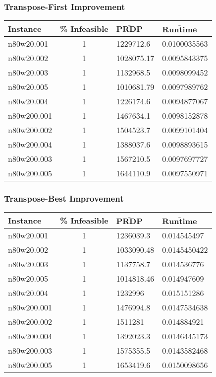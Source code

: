 \begin{homeworkProblem}
\subsubsection{Transpose-First Improvement}
\begin{center}
\begin{tabular}{|l|c|l|l|}
\hline
\textbf{Instance}& \textbf{\% Infeasible} & $\mathbf{\bar{PRDP}}$ &$\mathbf{\bar{Runtime}}$\\
\hline
n80w20.001&1&1229712.6&0.0100035563\\
\hline
n80w20.002&1&1028075.17&0.0095843375\\
\hline
n80w20.003&1&1132968.5&0.0098099452\\
\hline
n80w20.005&1&1010681.79&0.0097989762\\
\hline
n80w20.004&1&1226174.6&0.0094877067\\
\hline
n80w200.001&1&1467634.1&0.0098152878\\
\hline
n80w200.002&1&1504523.7&0.0099101404\\
\hline
n80w200.004&1&1388037.6&0.0098893615\\
\hline
n80w200.003&1&1567210.5&0.0097697727\\
\hline
n80w200.005&1&1644110.9&0.0097550971\\
\hline
\end{tabular}
\end{center}

\subsubsection{Transpose-Best Improvement}
\begin{center}
\begin{tabular}{|l|c|l|l|}
\hline
\textbf{Instance}& \textbf{\% Infeasible} & $\mathbf{\bar{PRDP}}$ &$\mathbf{\bar{Runtime}}$\\
\hline
n80w20.001&1&1236039.3&0.014545497\\
\hline
n80w20.002&1&1033090.48&0.0145450422\\
\hline
n80w20.003&1&1137758.7&0.014536776\\
\hline
n80w20.005&1&1014818.46&0.014947609\\
\hline
n80w20.004&1&1232996&0.015151286\\
\hline
n80w200.001&1&1476994.8&0.0147534638\\
\hline
n80w200.002&1&1511281&0.014884921\\
\hline
n80w200.004&1&1392023.3&0.0146445173\\
\hline
n80w200.003&1&1575355.5&0.0143582468\\
\hline
n80w200.005&1&1653419.6&0.0150098656\\
\hline
\end{tabular}
\end{center}


\end{homeworkProblem}
